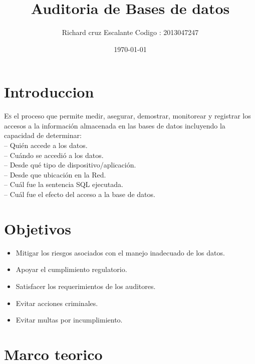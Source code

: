 \documentclass[twoside,twocolumn]{article}
\title{Auditoria de Bases de datos} %
\author{Richard cruz Escalante  Codigo : 2013047247}
\date{\today} %
\begin{document}
\maketitle


\section{Introduccion}
\lettrine[nindent=0em,lines=3]{E}s el proceso que permite medir, asegurar, demostrar, monitorear y registrar los accesos a la información almacenada en las bases de datos incluyendo la capacidad de determinar:
\\
– Quién accede a los datos.
\\
– Cuándo se accedió a los datos.
\\
– Desde qué tipo de dispositivo/aplicación.
\\
– Desde que ubicación en la Red.
\\
– Cuál fue la sentencia SQL ejecutada.
\\
– Cuál fue el efecto del acceso a la base de datos.


\section{Objetivos}

\begin{itemize}

\item Mitigar los riesgos asociados con el manejo inadecuado de los datos.
\item Apoyar el cumplimiento regulatorio.
\item Satisfacer los requerimientos de los auditores.
\item Evitar acciones criminales.
\item Evitar multas por incumplimiento.
\end{itemize}





\section{Marco teorico}
\end{document}

